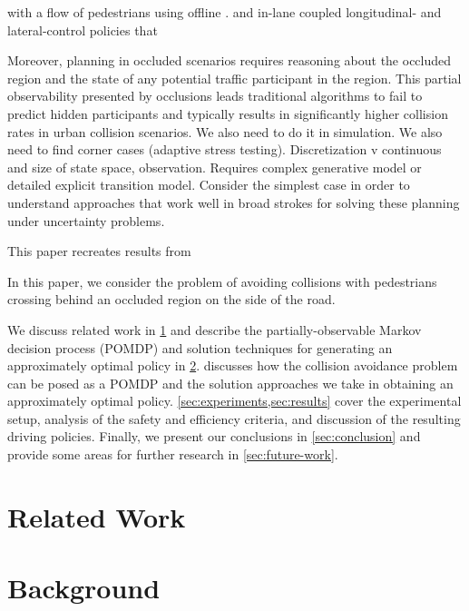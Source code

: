 \documentclass[conference]{IEEEtran}
\begin{document}
with a flow of pedestrians using offline  \cite{Thornton2019TowardValues,Bouton2018ScalableDriving}. and in-lane coupled longitudinal- and lateral-control policies that 

Moreover, planning in occluded scenarios requires reasoning about the occluded region and the state of any potential traffic participant in the region. This partial observability presented by occlusions leads traditional algorithms to fail to predict hidden participants and typically results in significantly higher collision rates in urban collision scenarios. We also need to do it in simulation. We also need to find corner cases (adaptive stress testing). Discretization v continuous and size of state space, observation. Requires complex generative model or detailed explicit transition model. Consider the simplest case in order to understand approaches that work well in broad strokes for solving these planning under uncertainty problems.

This paper recreates results from 

In this paper, we consider the problem of avoiding collisions with pedestrians crossing behind an occluded region on the side of the road. 

We discuss related work in \cref{sec:related-work} and describe the partially-observable Markov decision process (POMDP) and solution techniques for generating an approximately optimal policy in \cref{sec:background}.  discusses how the collision avoidance problem can be posed as a POMDP and the solution approaches we take in obtaining an approximately optimal policy. \cref{sec:experiments,sec:results} cover the experimental setup, analysis of the safety and efficiency criteria, and discussion of the resulting driving policies. Finally, we present our conclusions in \cref{sec:conclusion} and provide some areas for further research in \cref{sec:future-work}.


\section{Related Work}
\label{sec:related-work}

\section{Background}
\label{sec:background}
\end{document}
